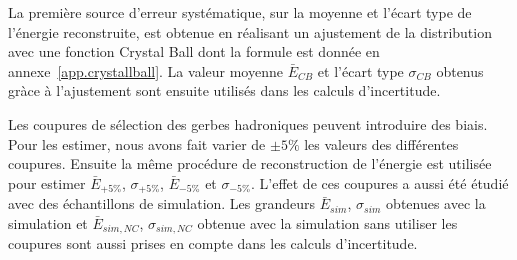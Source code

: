 La première source d'erreur systématique, sur la moyenne et l'écart type de l'énergie reconstruite, est obtenue en réalisant un ajustement de la distribution avec une fonction Crystal Ball \cite{CrystalBall} dont la formule est donnée en annexe~\ref{app.crystallball}. La valeur moyenne $\bar E_{CB}$ et l'écart type $\sigma_{CB}$ obtenus gràce à l'ajustement sont ensuite utilisés dans les calculs d'incertitude.

Les coupures de sélection des gerbes hadroniques peuvent introduire des biais. Pour les estimer, nous avons fait varier de $\pm5\%$ les valeurs des différentes coupures. Ensuite la même procédure de reconstruction de l'énergie est utilisée pour estimer $\bar{E}_{+5\%}$, $\sigma_{+5\%}$, $\bar{E}_{-5\%}$ et $\sigma_{-5\%}$. L'effet de ces coupures a aussi été étudié avec des échantillons de simulation. Les grandeurs $\bar{E}_{sim}$, $\sigma_{sim}$ obtenues avec la simulation et $\bar{E}_{sim,NC}$, $\sigma_{sim,NC}$ obtenue avec la simulation sans utiliser les coupures sont aussi prises en compte dans les calculs d'incertitude.

